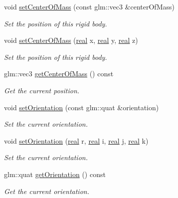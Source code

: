 \begin{DoxyCompactItemize}
void \mbox{\hyperlink{classr3_1_1_rigid_body_a96d0738162ca1fe649bab7174e21afd8}{set\+Center\+Of\+Mass}} (const glm\+::vec3 \&center\+Of\+Mass)
\begin{DoxyCompactList}\small\item\em Set the position of this rigid body. \end{DoxyCompactList}\item 
void \mbox{\hyperlink{classr3_1_1_rigid_body_aed33487eb4fdc0009b40361391cdf6c2}{set\+Center\+Of\+Mass}} (\mbox{\hyperlink{namespacer3_ab2016b3e3f743fb735afce242f0dc1eb}{real}} x, \mbox{\hyperlink{namespacer3_ab2016b3e3f743fb735afce242f0dc1eb}{real}} y, \mbox{\hyperlink{namespacer3_ab2016b3e3f743fb735afce242f0dc1eb}{real}} z)
\begin{DoxyCompactList}\small\item\em Set the position of this rigid body. \end{DoxyCompactList}\item 
glm\+::vec3 \mbox{\hyperlink{classr3_1_1_rigid_body_a9b802fe5774292fbc6ce80cccab15151}{get\+Center\+Of\+Mass}} () const
\begin{DoxyCompactList}\small\item\em Get the current position. \end{DoxyCompactList}\item 
void \mbox{\hyperlink{classr3_1_1_rigid_body_a2a93ca6f386411f14e5e8b844c214573}{set\+Orientation}} (const glm\+::quat \&orientation)
\begin{DoxyCompactList}\small\item\em Set the current orientation. \end{DoxyCompactList}\item 
void \mbox{\hyperlink{classr3_1_1_rigid_body_a8f6dcfce04ca4add81dce4f140e954c7}{set\+Orientation}} (\mbox{\hyperlink{namespacer3_ab2016b3e3f743fb735afce242f0dc1eb}{real}} r, \mbox{\hyperlink{namespacer3_ab2016b3e3f743fb735afce242f0dc1eb}{real}} i, \mbox{\hyperlink{namespacer3_ab2016b3e3f743fb735afce242f0dc1eb}{real}} j, \mbox{\hyperlink{namespacer3_ab2016b3e3f743fb735afce242f0dc1eb}{real}} k)
\begin{DoxyCompactList}\small\item\em Set the current orientation. \end{DoxyCompactList}\item 
glm\+::quat \mbox{\hyperlink{classr3_1_1_rigid_body_ae12d1d4d9dbbb970ed83fa1eab2d928a}{get\+Orientation}} () const
\begin{DoxyCompactList}\small\item\em Get the current orientation. \end{DoxyCompactList}\item 

\end{DoxyCompactItemize}
